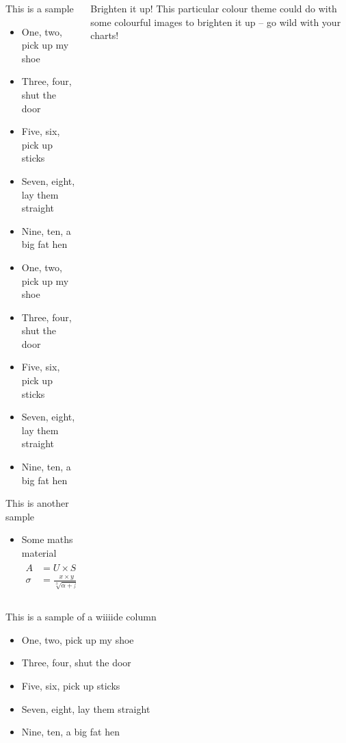 \documentclass[usenames, dvipsnames]{beamer}
\begin{document}
\begin{frame}[fragile]
\begin{columns}[T]
\begin{column}{.3\textwidth}
\begin{block}{This is a sample}
\begin{itemize}
\item One, two, pick up my shoe
\item Three, four, shut the door
\item Five, six, pick up sticks
\item Seven, eight, lay them straight
\item Nine, ten, a big fat hen
\item One, two, pick up my shoe
\item Three, four, shut the door
\item Five, six, pick up sticks
\item Seven, eight, lay them straight
\item Nine, ten, a big fat hen
\end{itemize}
\end{block}


\begin{block}{This is another sample}
\begin{itemize}
\item Some maths material
\begin{align}
A &= U \times S \times V^T\\
\sigma &= \frac{x\times y}{\sqrt[3]{\alpha + \beta}}
\end{align}
\end{itemize}
\end{block}
\end{column}

\begin{column}{.33\textwidth}
\begin{block}{Brighten it up!}
This particular colour theme could do with some colourful images to brighten it up -- go wild with your charts!

\end{block}
\end{column}

\end{columns}

\begin{block}{This is a sample of a wiiiide column}
\begin{itemize}
\item One, two, pick up my shoe
\item Three, four, shut the door
\item Five, six, pick up sticks
\item Seven, eight, lay them straight
\item Nine, ten, a big fat hen
\end{itemize}
\end{block}


\end{frame}
\end{document}
